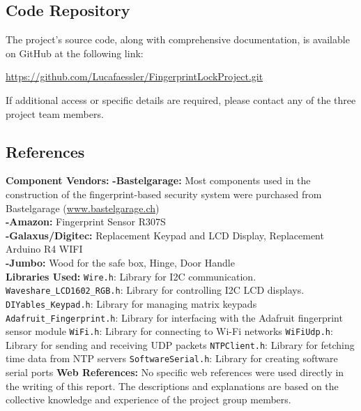 \documentclass{article}
\begin{document}
\subsection{Code Repository}
The project's source code, along with comprehensive documentation, is available on GitHub at the following link: 

\href{https://github.com/Lucafaessler/FingerprintLockProject.git}{https://github.com/Lucafaessler/FingerprintLockProject.git}

If additional access or specific details are required, please contact any of the three project team members.

\subsection{References}

\textbf{Component Vendors:}
\newline
\textbf{-Bastelgarage:} Most components used in the construction of the fingerprint-based security system were purchased from Bastelgarage (\href{https://www.bastelgarage.ch/}{www.bastelgarage.ch}) \\
\textbf{-Amazon:} Fingerprint Sensor R307S \\
\textbf{-Galaxus/Digitec:} Replacement Keypad and LCD Display, Replacement Arduino R4 WIFI\\
\textbf{-Jumbo:} Wood for the safe box, Hinge, Door Handle\\
\newline
\textbf{Libraries Used:}
\newline
\texttt{Wire.h}: Library for I2C communication.
\newline
\texttt{Waveshare\_LCD1602\_RGB.h}: Library for controlling I2C LCD displays.
\newline
\texttt{DIYables\_Keypad.h}: Library for managing matrix keypads
\newline
\texttt{Adafruit\_Fingerprint.h}: Library for interfacing with the Adafruit fingerprint sensor module
\newline
\texttt{WiFi.h}: Library for connecting to Wi-Fi networks
\newline
\texttt{WiFiUdp.h}: Library for sending and receiving UDP packets
\newline
\texttt{NTPClient.h}: Library for fetching time data from NTP servers
\newline
\texttt{SoftwareSerial.h}: Library for creating software serial ports
\newline
\newline
\textbf{Web References:}
\newline
No specific web references were used directly in the writing of this report. The descriptions and explanations are based on the collective knowledge and experience of the project group members.
\end{document}
